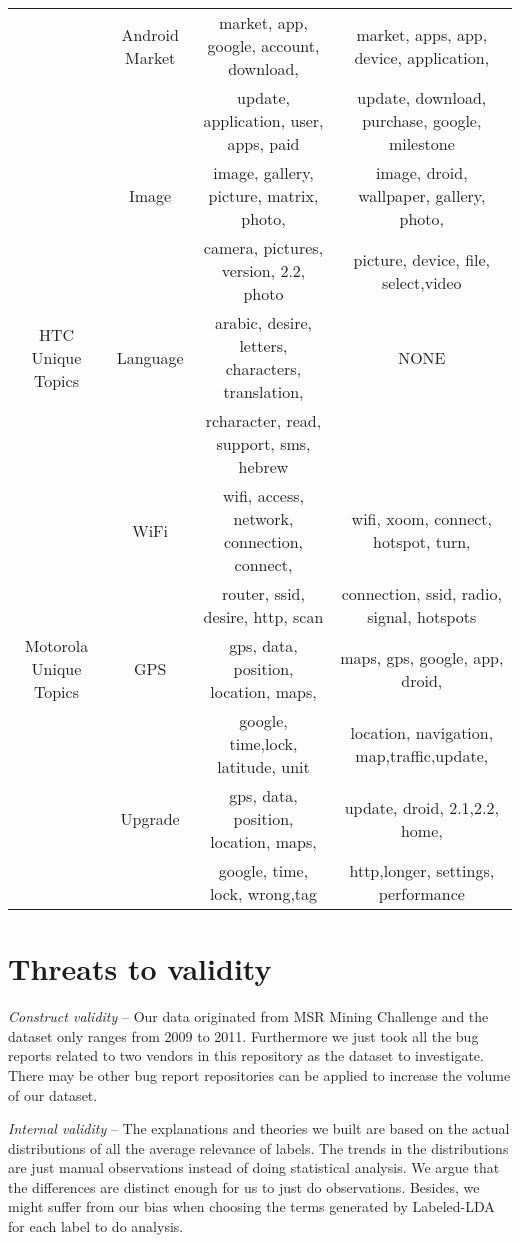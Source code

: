 \documentclass[10pt, conference, compsocconf]{IEEEtran}
\begin{document}
\begin{table*}[!htb]
\begin{tabular}{|c||c||c||c|}
               &Android Market& market, app, google, account, download, &market, apps, app, device, application,  \\
           &&update, application, user, apps,	paid &update, download, purchase, google,  milestone \\ \cline{2-4}
           
    &Image & image, gallery, picture, matrix, photo,  &image, droid, wallpaper, gallery, photo,\\
           &&camera, pictures, version, 2.2, photo& picture, device,	file, select,video\\

\hline
HTC Unique Topics & Language &arabic, desire, letters, characters, translation, & NONE\\
           &&rcharacter, read, support, sms, hebrew & \\ \cline{2-4}
    &WiFi & wifi, access, network, connection, connect, &wifi, xoom, connect, hotspot, turn, \\
           &&router, ssid, desire, http, scan&connection, ssid, radio, signal, hotspots\\
\hline
Motorola Unique Topics & GPS &gps, data, position, location, maps, &maps, gps, google, app, droid, \\
           &&google, time,lock, latitude, unit &location, navigation, map,traffic,update,\\ \cline{2-4}

    &Upgrade & gps, data, position, location, maps, &update, droid, 2.1,2.2, home, \\
           &&google, time, lock, wrong,tag&http,longer, settings, performance\\
\hline
\end{tabular}
\end{table*}

\section{Threats to validity}

\textit{Construct validity} – Our data originated from MSR Mining Challenge \cite{MSRChallenge2012} and the dataset only ranges from 2009 to 2011. Furthermore we just took all the bug reports related to two vendors in this repository as the dataset to investigate. There may be other bug report repositories can be applied to increase the volume of our dataset. 

\textit{Internal validity} – The explanations and theories we built are based on the actual distributions of all the  average relevance of labels. The trends in the distributions are just manual observations instead of doing statistical analysis. We argue that the differences are distinct enough for us to just do observations. Besides, we might suffer from our bias when choosing the terms generated by Labeled-LDA for each label to do analysis. 
\end{document}
